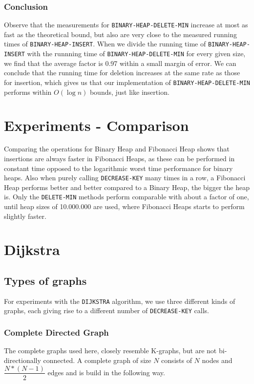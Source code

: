 \documentclass[a4paper,oneside,11pt]{article}
\begin{document}
\begin{itemize}
\subsubsection*{Conclusion}
Observe that the measurements for \texttt{BINARY-HEAP-DELETE-MIN} increase at most as fast as the theoretical bound, but also are very close to the measured running times of \texttt{BINARY-HEAP-INSERT}. When we divide the running time of \texttt{BINARY-HEAP-INSERT} with the runnning time of \texttt{BINARY-HEAP-DELETE-MIN} for every given size, we find that the average factor is 0.97 within a small margin of error. We can conclude that the running time for deletion increases at the same rate as those for insertion, which gives us that our implementation of \texttt{BINARY-HEAP-DELETE-MIN} performs within $O(\log n)$ bounds, just like insertion.

\section*{Experiments - Comparison}
Comparing the operations for Binary Heap and Fibonacci Heap shows that insertions are always faster in Fibonacci Heaps, as these can be performed in constant time opposed to the logarithmic worst time performance for binary heaps. Also when purely calling \texttt{DECREASE\--KEY} many times in a row, a Fibonacci Heap performs better and better compared to a Binary Heap, the bigger the heap is. Only the \texttt{DELETE\--MIN} methods perform comparable with about a factor of one, until heap sizes of 10.000.000 are used, where Fibonacci Heaps starts to perform slightly faster.

\section*{Dijkstra}
\subsection*{Types of graphs}
For experiments with the \texttt{DIJKSTRA} algorithm, we use three different kinds of graphs, each giving rise to a different number of \texttt{DECREASE\--KEY} calls.
\subsubsection*{Complete Directed Graph}
The complete graphs used here, closely resemble K-graphs, but are not bi-directionally connected. A complete graph of size $N$ consists of $N$ nodes and $\dfrac{N*(N-1)}{2}$ edges and is build in the following way.


\end{itemize}
\end{document}
